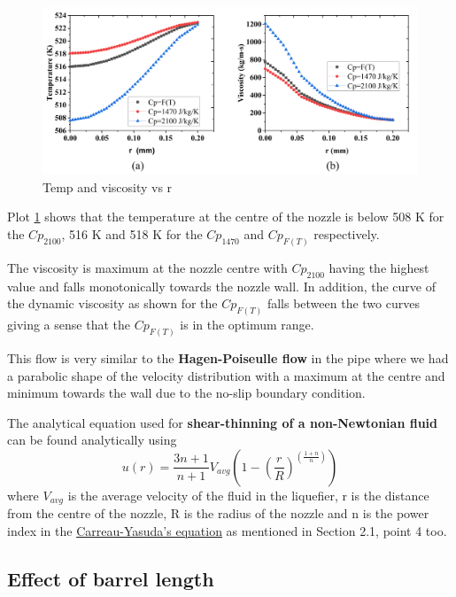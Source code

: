\documentclass{report}
\begin{document}
{\begin{figure}[!ht]
    \centering
    \includegraphics[scale=0.4]{T and mu vs r.png}
    \caption{Temp and viscosity vs r}
    \label{fig:T and mu vs r}
\end{figure}

Plot \ref{fig:T and mu vs r} shows that the temperature at the centre of the nozzle is below 508 K for the $Cp_{2100}$, 516 K and 518 K for the $Cp_{1470}$ and $Cp_{F(T)}$ respectively.

The viscosity is maximum at the nozzle centre with $Cp_{2100}$ having the highest value and falls monotonically towards the nozzle wall. In addition, the curve of the dynamic viscosity as shown for the $Cp_{F(T)}$ falls between the two curves giving a sense that the $Cp_{F(T)}$ is in the optimum range.

This flow is very similar to the \textbf{Hagen-Poiseulle flow} in the pipe where we had a parabolic shape of the velocity distribution with a maximum at the centre and minimum towards the wall due to the no-slip boundary condition.

The analytical equation used for \textbf{shear-thinning of a non-Newtonian 
fluid} can be found analytically using \[ u(r) = \frac{3n+1}{n+1} V_{avg} \left( 1-\left(\frac{r}{R}\right) ^{\left(\frac{1+n}{n}\right)} \right) \] where $V_{avg}$ is the average velocity of the fluid in the liquefier, r is the distance from the centre of the nozzle, R is the radius of the nozzle and n is the power index in the  \href{https://blog.rheosense.com/modeling-non-newtonian-fluids#:~:text=The%20Carreau%2DYasuda%20model%20is,Hackley%20and%20Ferraris%2C%202001)}{Carreau-Yasuda’s equation} as mentioned in Section 2.1, point 4 too.

\subsection{Effect of barrel length}

}
\end{document}
